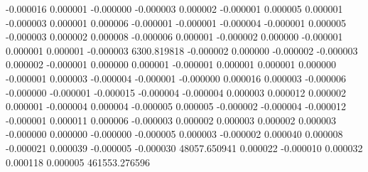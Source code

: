                                -0.000016            0.000001           -0.000000           -0.000003            0.000002           -0.000001            0.000005            0.000001           -0.000003            0.000001            0.000006           -0.000001           -0.000001           -0.000004           -0.000001            0.000005           -0.000003            0.000002            0.000008           -0.000006            0.000001           -0.000002            0.000000           -0.000001            0.000001            0.000001           -0.000003         6300.819818           -0.000002            0.000000           -0.000002           -0.000003            0.000002           -0.000001            0.000000            0.000001           -0.000001            0.000001            0.000001            0.000000           -0.000001            0.000003           -0.000004           -0.000001           -0.000000            0.000016            0.000003           -0.000006           -0.000000           -0.000001           -0.000015           -0.000004           -0.000004            0.000003            0.000012            0.000002            0.000001           -0.000004            0.000004           -0.000005            0.000005           -0.000002           -0.000004           -0.000012           -0.000001            0.000011            0.000006           -0.000003            0.000002            0.000003            0.000002            0.000003           -0.000000            0.000000           -0.000000           -0.000005            0.000003           -0.000002            0.000040            0.000008           -0.000021            0.000039           -0.000005           -0.000030        48057.650941            0.000022           -0.000010            0.000032            0.000118            0.000005       461553.276596